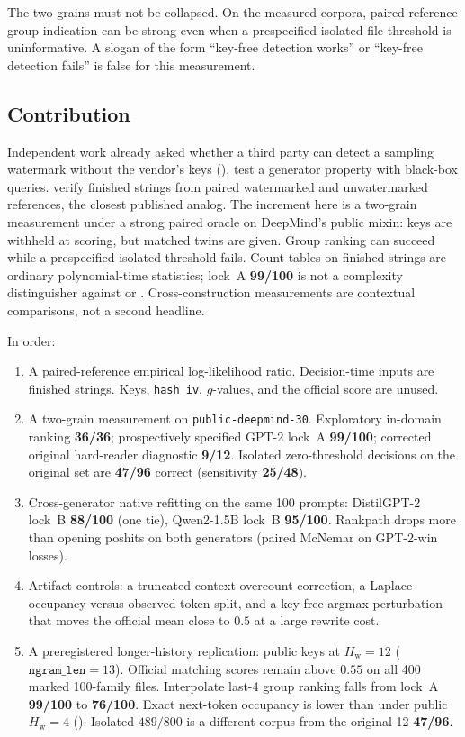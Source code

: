 \documentclass[11pt,a4paper]{article}
\theoremstyle{definition}
\newcommand{\Hw}{H_{\mathrm{w}}}
\begin{document}
The two grains must not be collapsed. On the measured corpora,
paired-reference group indication can be strong even when a prespecified
isolated-file threshold is uninformative. A slogan of the form
``key-free detection works'' or ``key-free detection fails'' is false
for this measurement.

\subsection{Contribution}

Independent work already asked whether a third party can detect a
sampling watermark without the vendor's keys ().
\citet{gloaguen2025blackbox} test a generator property with black-box
queries. \citet{wang2026ttp} verify finished strings from paired
watermarked and unwatermarked references, the closest published analog.
The increment here is a two-grain measurement under a strong paired
oracle on DeepMind's public mixin: keys are withheld at scoring, but
matched twins are given. Group ranking can succeed while a prespecified
isolated threshold fails. Count tables on finished strings are
ordinary polynomial-time statistics; lock~A \textbf{99/100} is not a
complexity distinguisher against \citet{christ2024undetectable} or
\citet{zhang2024sand}. Cross-construction measurements are contextual
comparisons, not a second headline.

In order:

\begin{enumerate}[leftmargin=*]
\item A paired-reference empirical log-likelihood ratio. Decision-time
inputs are finished strings. Keys, \texttt{hash\_iv}, $g$-values, and
the official score are unused.
\item A two-grain measurement on \texttt{public-deepmind-30}. Exploratory
in-domain ranking \textbf{36/36}; prospectively specified GPT-2 lock~A
\textbf{99/100}; corrected original hard-reader diagnostic \textbf{9/12}.
Isolated zero-threshold decisions on the original set are
\textbf{47/96} correct (sensitivity \textbf{25/48}).
\item Cross-generator native refitting on the same 100 prompts:
DistilGPT-2 lock~B \textbf{88/100} (one tie), Qwen2-1.5B lock~B
\textbf{95/100}. Rankpath drops more than opening poshits on both
generators (paired McNemar on GPT-2-win losses).
\item Artifact controls: a truncated-context overcount correction, a
Laplace occupancy versus observed-token split, and a key-free argmax
perturbation that moves the official mean close to $0.5$ at a large
rewrite cost.
\item A preregistered longer-history replication: public keys at
$\Hw=12$ ($\mathtt{ngram\_len}=13$). Official matching scores remain
above $0.55$ on all 400 marked 100-family files. Interpolate last-4
group ranking falls from lock~A \textbf{99/100} to \textbf{76/100}.
Exact next-token occupancy is lower than under public $\Hw=4$
(). Isolated $489/800$ is a different corpus from the original-12
\textbf{47/96}.
\end{enumerate}
\end{document}
